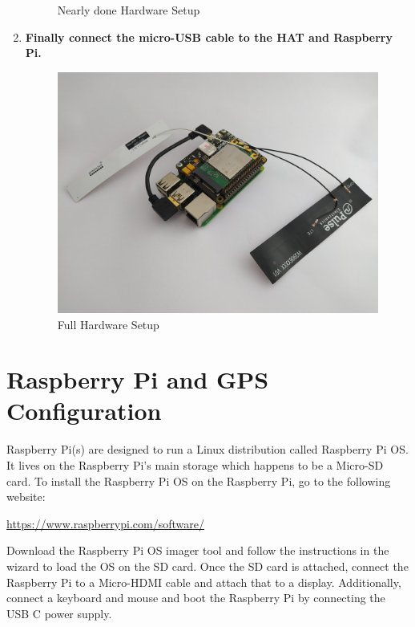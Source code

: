 \documentclass[12pt, letterpaper]{article}
\begin{document}
\begin{enumerate}[label=\large{\textbf{\arabic*}.}]
\begin{figure}[h!]
	\caption{Nearly done Hardware Setup}
	\end{figure}	
	\newpage
	\item \textbf{\large{Finally connect the micro-USB cable to the HAT and Raspberry Pi.}}
	\begin{figure}[h!]
	\centering
	\includegraphics[width=1\columnwidth]{assets/Raspberry-Pi-Base-HAT-Quectel-Getting-Started-5-scaled.jpg}
	\caption{Full Hardware Setup}
	\end{figure}	
\end{enumerate}


\section {Raspberry Pi and GPS Configuration}

\par Raspberry Pi(s) are designed to run a Linux distribution called Raspberry Pi OS. It lives on the Raspberry Pi's main storage which happens to be a Micro-SD card. To install the Raspberry Pi OS on the Raspberry Pi, go to the following website: \\
\par{\url{https://www.raspberrypi.com/software/}}\\
\par Download the Raspberry Pi OS imager tool and follow the instructions in the wizard to load the OS on the SD card. Once the SD card is attached,  connect the Raspberry Pi to a Micro-HDMI cable and attach that to a display. Additionally, connect a keyboard and mouse and boot the Raspberry Pi by connecting the USB C power supply. \\
\end{document}
